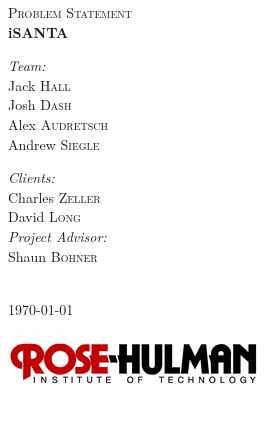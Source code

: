 \documentclass[11pt]{article}
\begin{document}
\begin{titlepage}
\begin{center}
\textsc{\Large Problem Statement}\\[0.5cm]
{ \Huge \bfseries iSANTA}\\[0.4cm]

\begin{minipage}{0.4\textwidth}
\begin{flushleft} \large
\emph{Team:}\\
Jack \textsc{Hall}\\
Josh \textsc{Dash}\\
Alex \textsc{Audretsch}\\
Andrew \textsc{Siegle}\\
\end{flushleft}
\end{minipage}
\begin{minipage}{0.4\textwidth}
\begin{flushright} \large
\emph{Clients:} \\
Charles \textsc{Zeller}\\
David \textsc{Long}\\
\emph{Project Advisor:}\\
Shaun \textsc{Bohner}
\end{flushright}
\end{minipage}
\\[1cm]
{\large \today}

\begin{center}
\includegraphics[scale = 4, angle = 0]{Rose-HulmanLogo.png}
\end{center}
\textcolor{white}{.}%
\\[3cm]

\end{center}

\end{titlepage}
\end{document}
